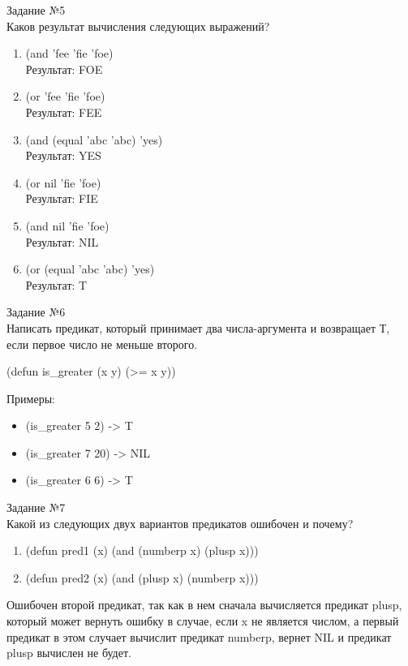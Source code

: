 {\LARGE Задание №5}\\

Каков результат вычисления следующих выражений?

\begin{enumerate}
\item (and 'fee 'fie 'foe)\\
Результат: FOE
\item (or 'fee 'fie 'foe)\\
Результат: FEE
\item (and (equal 'abc 'abc) 'yes)\\
Результат: YES
\item (or nil 'fie 'foe)\\
Результат: FIE
\item (and nil 'fie 'foe)\\
Результат: NIL
\item (or (equal 'abc 'abc) 'yes)\\
Результат: T\\
\end{enumerate}

\newpage
\vspace*{10mm}
{\LARGE Задание №6}\\

Написать предикат, который принимает два числа-аргумента и возвращает Т, если первое число не меньше второго.

(defun is\_greater (x y) (>= x y))

Примеры:
\begin{itemize}
\item (is\_greater 5 2) -> T
\item (is\_greater 7 20) -> NIL
\item (is\_greater 6 6) -> T\\
\end{itemize}

{\LARGE Задание №7}\\

Какой из следующих двух вариантов предикатов ошибочен и почему?

\begin{enumerate}
\item (defun pred1 (x) (and (numberp x) (plusp x)))
\item (defun pred2 (x) (and (plusp x) (numberp x)))
\end{enumerate} 

Ошибочен второй предикат, так как в нем сначала вычисляется предикат plusp, который может вернуть ошибку в случае, если x не является числом, а первый предикат в этом случает вычислит предикат numberp, вернет NIL и предикат plusp вычислен не будет.\\

